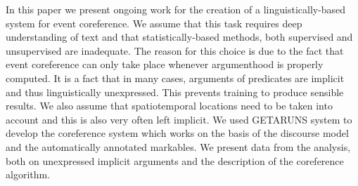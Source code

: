 In this paper we present ongoing work for the creation of a linguistically-based system for event coreference. We assume that this task
 requires deep understanding of text and that statistically-based methods, both
 supervised and unsupervised are inadequate. The reason for this choice is due
 to the fact that event coreference can only take place whenever argumenthood is
 properly computed. It is a fact that in many cases, arguments of predicates are
 implicit and thus linguistically unexpressed. This prevents training to produce
 sensible results. We also assume that spatiotemporal locations need to be taken
 into account and this is also very often left implicit. We used GETARUNS system
 to develop the coreference system which works on the basis of the discourse
 model and the automatically annotated markables. We present data from the
 analysis, both on unexpressed implicit arguments and the description of the
 coreference algorithm.

